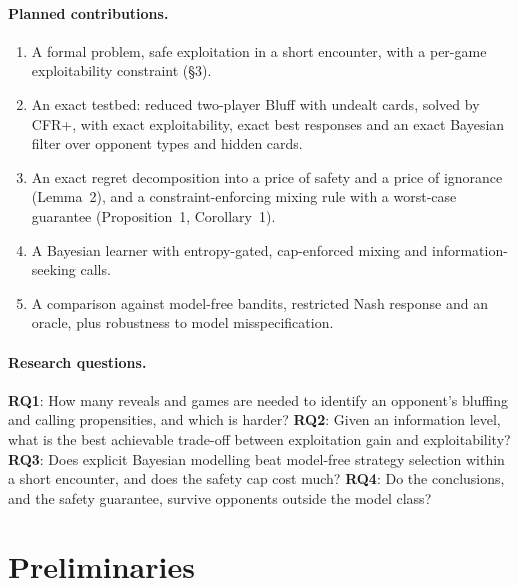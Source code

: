 \documentclass[11pt]{article}
\newcommand{\new}[1]{\textcolor{blue!55!black}{#1}}
\begin{document}
\paragraph{Planned contributions.}
\begin{enumerate}
\item A formal problem, safe exploitation in a short encounter, with a per-game exploitability constraint (\S3).
\item An exact testbed: reduced two-player Bluff \new{with undealt cards}, solved by CFR+, with exact exploitability, exact best responses and an exact Bayesian filter over opponent types and hidden cards.
\item An exact regret decomposition into a price of safety and a price of ignorance (Lemma~2), \new{and a constraint-enforcing mixing rule with a worst-case guarantee (Proposition~1, Corollary~1)}.
\item A Bayesian learner with entropy-gated, cap-enforced mixing and information-seeking calls.
\item A comparison against model-free bandits, restricted Nash response and an oracle, plus robustness to model misspecification.
\end{enumerate}

\paragraph{Research questions.} \textbf{RQ1}: How many reveals and games are needed to identify an opponent's bluffing and calling propensities, and which is harder? \textbf{RQ2}: Given an information level, what is the best achievable trade-off between exploitation gain and exploitability? \textbf{RQ3}: Does explicit Bayesian modelling beat model-free strategy selection within a short encounter, and does the safety cap cost much? \textbf{RQ4}: Do the conclusions, and the safety guarantee, survive opponents outside the model class?

\section{Preliminaries}
\end{document}
